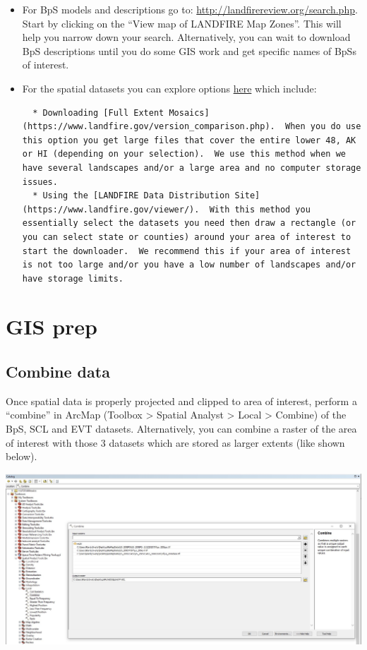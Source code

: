 \documentclass[
]{book}
\begin{document}
\begin{itemize}
\item
  For BpS models and descriptions go to: \url{http://landfirereview.org/search.php}. Start by clicking on the ``View map of LANDFIRE Map Zones''. This will help you narrow down your search. Alternatively, you can wait to download BpS descriptions until you do some GIS work and get specific names of BpSs of interest.
\item
  For the spatial datasets you can explore options \href{https://www.landfire.gov/getdata.php}{here} which include:

\begin{verbatim}
  * Downloading [Full Extent Mosaics](https://www.landfire.gov/version_comparison.php).  When you do use this option you get large files that cover the entire lower 48, AK or HI (depending on your selection).  We use this method when we have several landscapes and/or a large area and no computer storage issues.
  * Using the [LANDFIRE Data Distribution Site](https://www.landfire.gov/viewer/).  With this method you essentially select the datasets you need then draw a rectangle (or you can select state or counties) around your area of interest to start the downloader.  We recommend this if your area of interest is not too large and/or you have a low number of landscapes and/or have storage limits.
\end{verbatim}
\end{itemize}

\hypertarget{gisPrep}{%
\chapter{GIS prep}\label{gisPrep}}

\hypertarget{combine-data}{%
\section{Combine data}\label{combine-data}}

Once spatial data is properly projected and clipped to area of interest, perform a ``combine'' in ArcMap (Toolbox \textgreater{} Spatial Analyst \textgreater{} Local \textgreater{} Combine) of the BpS, SCL and EVT datasets. Alternatively, you can combine a raster of the area of interest with those 3 datasets which are stored as larger extents (like shown below).

\includegraphics[width=1\linewidth]{combine}
\end{document}

